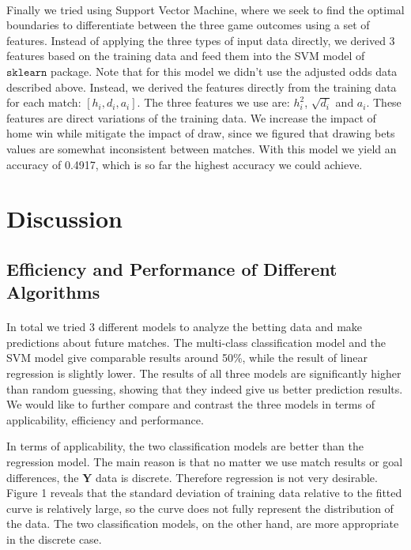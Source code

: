 \documentclass[12pt]{article}
\begin{document}
\paragraph{}
Finally we tried using Support Vector Machine, where we seek to find the optimal boundaries to differentiate between the three game outcomes using a set of features. Instead of applying the three types of input data directly, we derived 3 features based on the training data and feed them into the SVM model of $\texttt{sklearn}$ package. Note that for this model we didn't use the adjusted odds data described above. Instead, we derived the features directly from the training data for each match: $[h_i, d_i, a_i]$. The three features we use are: $h_i^2$, $\sqrt{d_i}$ and $a_i$. These features are direct variations of the training data. We increase the impact of home win while mitigate the impact of draw, since we figured that drawing bets values are somewhat inconsistent between matches. With this model we yield an accuracy of 0.4917, which is so far the highest accuracy we could achieve.

\section{Discussion}
\subsection{Efficiency and Performance of Different Algorithms}

\paragraph{}
In total we tried 3 different models to analyze the betting data and make predictions about future matches. The multi-class classification model and the SVM model give comparable results around 50\%, while the result of linear regression is slightly lower. The results of all three models are significantly higher than random guessing, showing that they indeed give us better prediction results. We would like to further compare and contrast the three models in terms of applicability, efficiency and performance. 

In terms of applicability, the two classification models are better than the regression model. The main reason is that no matter we use match results or goal differences, the $\mathbf{Y}$ data is discrete. Therefore regression is not very desirable. Figure 1 reveals that the standard deviation of training data relative to the fitted curve is relatively large, so the curve does not fully represent the distribution of the data. The two classification models, on the other hand, are more appropriate in the discrete case.
\end{document}
